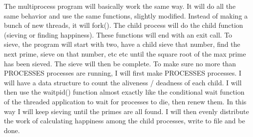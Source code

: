 \documentclass[11pt]{article}
\begin{document}
The multiprocess program will basically work the same way. It will do all the same behavior and use the same functions, slightly modified. Instead of making a bunch of new threads, it will fork(). The child process will do the child function (sieving or finding happiness). These functions will end with an exit call. To sieve, the program will start with two, have a child sieve that number, find the next prime, sieve on that number, etc etc until the square root of the max prime has been sieved. The sieve will then be complete. To make sure no more than PROCESSES processes are running, I will first make PROCESSES processes. I will have a data structure to count the aliveness / deadness of each child. I will then use the waitpid() function almost exactly like the conditional wait function of the threaded application to wait for processes to die, then renew them. In this way I will keep sieving until the primes are all found. I will then evenly distribute the work of calculating happiness among the child processes, write to file and be done. \\
\end{document}
